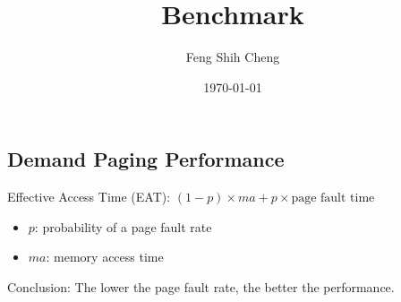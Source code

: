 \documentclass[12pt,a4paper]{article}
\title{Benchmark}
\author{Feng Shih Cheng}
\date{\today}
\begin{document}
\maketitle

\subsection*{Demand Paging Performance}
Effective Access Time (EAT): $(1 - p) \times ma + p \times \text{page fault time}$
\begin{itemize}
    \item $p$: probability of a page fault rate
    \item $ma$: memory access time
\end{itemize}

Conclusion: The lower the page fault rate, the better the performance.
\end{document}
